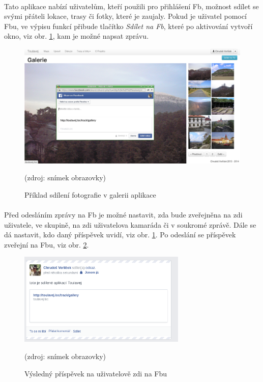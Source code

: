 \documentclass[11pt,a4paper,titlepage,oneside]{book}
\begin{document}
				\paragraph{}Tato aplikace nabízí uživatelům, kteří použili pro přihlášení \acl{Fb}, možnost sdílet se svými přáteli lokace, trasy či fotky, které je zaujaly. Pokud je uživatel pomocí \acl{Fb}u, ve výpisu funkcí přibude tlačítko \textit{Sdílet na Fb}, které po aktivování vytvoří okno, viz obr. \ref{fig:fbShare1}, kam je možné napsat zprávu.
		\begin{figure}[!h]
			\begin{center}
				\includegraphics[width=12cm]{obrazky/toulavej/fbShareGallery.png}
				\caption{Příklad sdílení fotografie v galerii aplikace }
				\label{fig:fbShare1}
				(zdroj: snímek obrazovky)
			\end{center}
		\end{figure}
	\paragraph{}Před odesláním zprávy na \acl{Fb} je možné nastavit, zda bude zveřejněna na zdi uživatele, ve skupině, na zdi uživatelova kamaráda či v soukromé zprávě. Dále se dá nastavit, kdo daný příspěvek uvidí, viz obr. \ref{fig:fbShare1}.  Po odeslání se příspěvek zveřejní na \acl{Fb}u, viz obr. \ref{fig:fbShare2}.
		\begin{figure}[!h]
			\begin{center}
				\includegraphics[width=8cm]{obrazky/toulavej/fbSharefb.png}
				\caption{Výsledný příspěvek na uživatelově zdi na \acl{Fb}u}
				\label{fig:fbShare2}
				(zdroj: snímek obrazovky)
			\end{center}
		\end{figure}				
\end{document}
